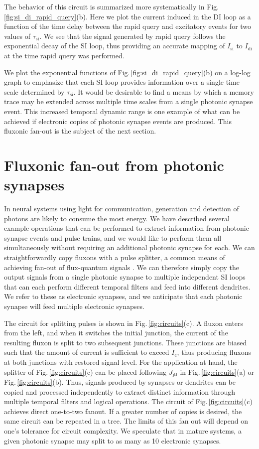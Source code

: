 \documentclass[twocolumn]{article}
\begin{document}
The behavior of this circuit is summarized more systematically in Fig.\,\ref{fig:si_di_rapid_query}(b). Here we plot the current induced in the DI loop as a function of the time delay between the rapid query and excitatory events for two values of $\tau_{\mathrm{si}}$. We see that the signal generated by rapid query follows the exponential decay of the SI loop, thus providing an accurate mapping of $I_{\mathrm{si}}$ to $I_{\mathrm{di}}$ at the time rapid query was performed. 

We plot the exponential functions of Fig.\,\ref{fig:si_di_rapid_query}(b) on a log-log graph to emphasize that each SI loop provides information over a single time scale determined by $\tau_{\mathrm{si}}$. It would be desirable to find a means by which a memory trace may be extended across multiple time scales from a single photonic synapse event. This increased temporal dynamic range is one example of what can be achieved if electronic copies of photonic synapse events are produced. This fluxonic fan-out is the subject of the next section.

\section{\label{sec:fluxonic_fanout}Fluxonic fan-out from photonic synapses}
In neural systems using light for communication, generation and detection of photons are likely to consume the most energy. We have described several example operations that can be performed to extract information from photonic synapse events and pulse trains, and we would like to perform them all simultaneously without requiring an additional photonic synapse for each. We can straightforwardly copy fluxons with a pulse splitter, a common means of achieving fan-out of flux-quantum signals \cite{lise1991}. We can therefore simply copy the output signals from a single photonic synapse to multiple independent SI loops that can each perform different temporal filters and feed into different dendrites. We refer to these as electronic synapses, and we anticipate that each photonic synapse will feed multiple electronic synapses.

The circuit for splitting pulses is shown in Fig.\,\ref{fig:circuits}(c). A fluxon enters from the left, and when it switches the initial junction, the current of the resulting fluxon is split to two subsequent junctions. These junctions are biased such that the amount of current is sufficient to exceed $I_{\mathrm{c}}$, thus producing fluxons at both junctions with restored signal level. For the application at hand, the splitter of Fig.\,\ref{fig:circuits}(c) can be placed following $J_{\mathrm{jtl}}$ in Fig.\,\ref{fig:circuits}(a) or Fig.\,\ref{fig:circuits}(b). Thus, signals produced by synapses or dendrites can be copied and processed independently to extract distinct information through multiple temporal filters and logical operations. The circuit of Fig.\,\ref{fig:circuits}(c) achieves direct one-to-two fanout. If a greater number of copies is desired, the same circuit can be repeated in a tree. The limits of this fan out will depend on one's tolerance for circuit complexity. We speculate that in mature systems, a given photonic synapse may split to as many as 10 electronic synapses. 
\end{document}
